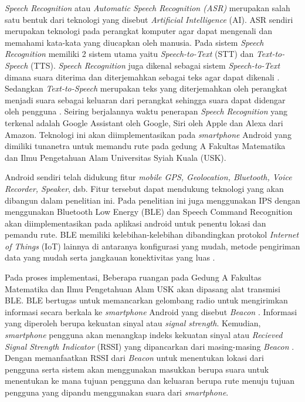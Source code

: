 \newpage

\par \textit{Speech Recognition} atau \textit{Automatic Speech Recognition (ASR)} merupakan salah satu bentuk dari teknologi yang disebut \textit{Artificial Intelligence} (AI). ASR sendiri merupakan teknologi pada perangkat komputer agar dapat mengenali dan memahami kata-kata yang diucapkan oleh manusia. Pada sistem \textit{Speech Recognition} memiliki 2 sistem utama yaitu \textit{Speech-to-Text} (STT) dan \textit{Text-to-Speech} (TTS). \textit{Speech Recognition} juga dikenal sebagai sistem \textit{Speech-to-Text} dimana suara diterima dan diterjemahkan sebagai teks agar dapat dikenali \citep{mustikarini2019real}. 
Sedangkan \textit{Text-to-Speech} merupakan teks yang diterjemahkan oleh perangkat menjadi suara sebagai keluaran dari perangkat sehingga suara dapat didengar oleh pengguna \citep{mustikarini2019real}. Seiring berjalannya waktu penerapan \textit{Speech Recognition} yang terkenal adalah Google Assistant oleh Google, Siri oleh Apple dan Alexa dari Amazon. Teknologi ini akan diimplementasikan pada \textit{smartphone} Android yang dimiliki tunanetra untuk memandu rute pada gedung A Fakultas Matematika dan Ilmu Pengetahuan Alam Universitas Syiah Kuala (USK).

\par Android sendiri telah didukung fitur \textit{mobile GPS, Geolocation, Bluetooth, Voice Recorder, Speaker}, dsb. Fitur tersebut dapat mendukung teknologi yang akan dibangun dalam penelitian ini. Pada penelitian ini juga menggunakan IPS dengan menggunakan Bluetooth Low Energy (BLE) dan Speech Command Recognition akan diimplementasikan pada aplikasi android untuk penentu lokasi dan pemandu rute. BLE memiliki kelebihan-kelebihan dibandingkan protokol \textit{Internet of Things} (IoT) lainnya di antaranya konfigurasi yang mudah, metode pengiriman data yang mudah serta jangkauan konektivitas yang luas \citep{puspitasari2020}. 

\par Pada proses implementasi, Beberapa ruangan pada Gedung A Fakultas Matematika dan Ilmu Pengetahuan Alam USK akan dipasang alat transmisi BLE. BLE bertugas untuk memancarkan gelombang radio untuk mengirimkan informasi secara berkala ke \textit{smartphone} Android yang disebut \textit{Beacon} \citep{lin2018interactive}. Informasi yang diperoleh berupa kekuatan sinyal atau \textit{signal strength}. Kemudian, \textit{smartphone} pengguna akan menangkap indeks kekuatan sinyal atau \textit{Recieved Signal Strength Indicator} (RSSI) yang dipancarkan dari masing-masing \textit{Beacon} \citep{li2018indoor}. Dengan memanfaatkan RSSI dari \textit{Beacon} untuk menentukan lokasi dari pengguna serta sistem akan menggunakan masukkan berupa suara untuk menentukan ke mana tujuan pengguna dan keluaran berupa rute menuju tujuan pengguna yang dipandu menggunakan suara dari \textit{smartphone}.

